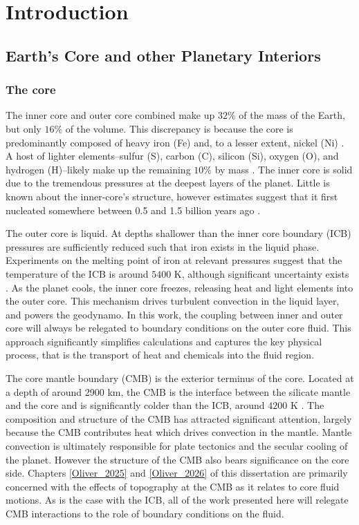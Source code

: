 \chapter{Introduction}
\label{Introduction}
\section{Earth's Core and other Planetary Interiors}
\label{s:pi}
\subsection{The core}
\label{s:thecore}
The inner core and outer core combined make up $32\%$ of the mass of the Earth, but only $16\%$ of the volume. 
This discrepancy is because the core is predominantly composed of heavy iron (Fe) and, to a lesser extent, nickel (Ni) \citep{hK13}.
A host of lighter elements--sulfur (S), carbon (C), silicon (Si), oxygen (O), and hydrogen (H)--likely make up the remaining $10\%$ by mass \citep{fB52,jP94}. 
The inner core is solid due to the tremendous pressures at the deepest layers of the planet. Little is known about the inner-core's structure, however estimates suggest that it first nucleated somewhere between 0.5 and 1.5 billion years ago \citep{aB15,cD15,sL15}.

The outer core is liquid. At depths shallower than the inner core boundary (ICB) pressures are sufficiently reduced such that iron exists in the liquid phase. 
Experiments on the melting point of iron at relevant pressures suggest that the temperature of the ICB is around $5400$ K, although significant uncertainty exists \citep{dA09,rB93,aL00,jN04}.
As the planet cools, the inner core freezes, releasing heat and light elements into the outer core. 
This mechanism drives turbulent convection in the liquid layer, and powers the geodynamo.
In this work, the coupling between inner and outer core will always be relegated to boundary conditions on the outer core fluid. 
This approach significantly simplifies calculations and captures the key physical process, that is the transport of heat and chemicals into the fluid region.

The core mantle boundary (CMB) is the exterior terminus of the core. 
Located at a depth of around 2900 km, the CMB is the interface between the silicate mantle and the core and is significantly colder than the ICB, around $4200$ K \citep{lS09,gF10}.
The composition and structure of the CMB has attracted significant attention, largely because the CMB contributes heat which drives convection in the mantle. Mantle convection is ultimately responsible for plate tectonics \citep{gS01} and the secular cooling of the planet.
However the structure of the CMB also bears significance on the core side. 
Chapters \ref{Oliver_2025} and \ref{Oliver_2026} of this dissertation are primarily concerned with the effects of topography at the CMB as it relates to core fluid motions.
As is the case with the ICB, all of the work presented here will relegate CMB interactions to the role of boundary conditions on the fluid.


